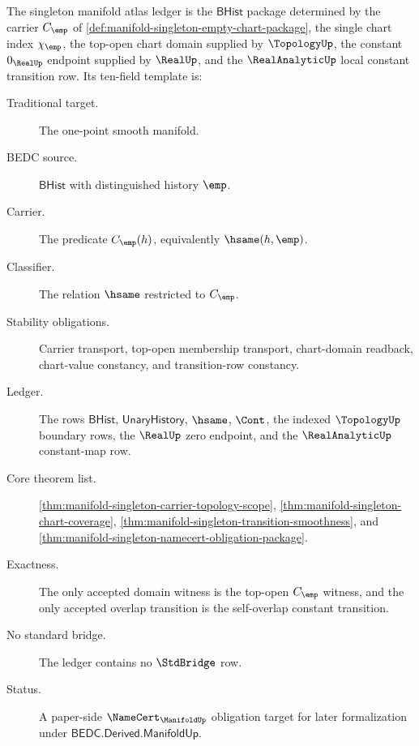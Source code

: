 \begin{definition}
\label{def:manifold-singleton-atlas-ledger}
The singleton manifold atlas ledger is the $\mathsf{BHist}$ package determined
by the carrier $C_{\emp}$ of
\autoref{def:manifold-singleton-empty-chart-package}, the single chart index
$\chi_{\emp}$, the top-open chart domain supplied by $\TopologyUp$, the constant
$0_{\RealUp}$ endpoint supplied by $\RealUp$, and the
$\RealAnalyticUp$ local constant transition row. Its ten-field template is:
\begin{description}
\item[Traditional target.] The one-point smooth manifold.
\item[BEDC source.] $\mathsf{BHist}$ with distinguished history $\emp$.
\item[Carrier.] The predicate $C_{\emp}(h)$, equivalently $\hsame(h,\emp)$.
\item[Classifier.] The relation $\hsame$ restricted to $C_{\emp}$.
\item[Stability obligations.] Carrier transport, top-open membership transport,
chart-domain readback, chart-value constancy, and transition-row constancy.
\item[Ledger.] The rows
$\mathsf{BHist}$, $\mathsf{UnaryHistory}$, $\hsame$, $\Cont$, the indexed
$\TopologyUp$ boundary rows, the $\RealUp$ zero endpoint, and the
$\RealAnalyticUp$ constant-map row.
\item[Core theorem list.]
\autoref{thm:manifold-singleton-carrier-topology-scope},
\autoref{thm:manifold-singleton-chart-coverage},
\autoref{thm:manifold-singleton-transition-smoothness}, and
\autoref{thm:manifold-singleton-namecert-obligation-package}.
\item[Exactness.] The only accepted domain witness is the top-open
$C_{\emp}$ witness, and the only accepted overlap transition is the
self-overlap constant transition.
\item[No standard bridge.] The ledger contains no $\StdBridge$ row.
\item[Status.] A paper-side $\NameCert_{\ManifoldUp}$ obligation target for
later formalization under $\mathsf{BEDC.Derived.ManifoldUp}$.
\end{description}
\end{definition}


